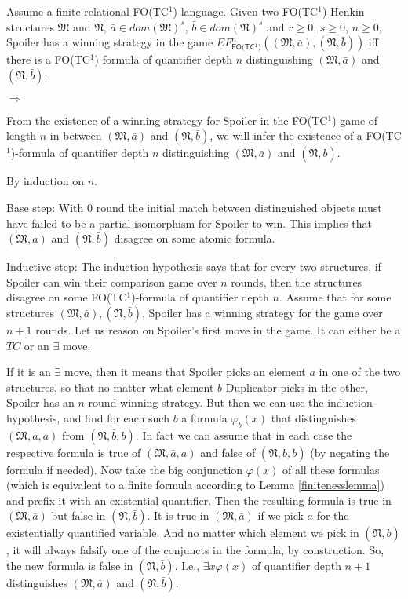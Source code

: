 \documentclass{LMCS}
\newcommand{\frM}{\mathfrak{M}}
\newcommand{\frN}{\mathfrak{N}}
\newcommand{\fotc}{\textsf{FO(TC$^1$)}\xspace}
\begin{document}
\begin{thm}[\fotc Adequacy]\label{thm:effotc}
  Assume a finite relational \fotc language. Given two \fotc-Henkin structures $\frM$ and
  $\frN$, $\bar{a} \in dom(\frM)^s$, $\bar{b} \in dom(\frN)^s$ and $r \geq 0$, $s \geq 0$, $n \geq 0$,
  Spoiler has a winning strategy in the game $EF_\fotc^n((\frM, \bar{a}), (\frN, \bar{b}))$ iff
  there is a \fotc formula of quantifier depth $n$ distinguishing $(\frM, \bar{a})$ and $(\frN, \bar{b})$.
\end{thm}

\proof\hfill

\begin{iteMize}{$\Rightarrow$}

\item From the existence of a winning strategy for
Spoiler in the \fotc-game of length $n$ in between $(\frM, \bar{a})$ and $(\frN, \bar{b})$, we will infer the
existence of a \fotc-formula of quantifier depth $n$
distinguishing $(\frM,\bar{a})$ and $(\frN,\bar{b})$.

By induction on $n$.

Base step: With $0$ round the initial match between distinguished objects must have failed to be a partial isomorphism for Spoiler to win. This
implies that $(\frM, \bar{a})$ and $(\frN, \bar{b})$ disagree on some atomic formula.

Inductive step: The induction hypothesis says that for every two
structures, if Spoiler can win their comparison game over $n$ rounds,
then the structures disagree on some \fotc-formula of quantifier depth
$n$.  Assume that for some structures $(\frM, \bar{a}), (\frN,
\bar{b})$, Spoiler has a winning strategy for the game over $n+1$
rounds. Let us reason on Spoiler's first move in the game. It can
either be a $TC$ or an $\exists$ move.

If it is an $\exists$ move, then it means that Spoiler picks an
element $a$ in one of the two structures, so that no matter what
element $b$ Duplicator picks in the other, Spoiler has an
$n$-round winning strategy. But then we can use the induction
hypothesis, and find for each such $b$ a formula $\varphi_b(x)$
that distinguishes $(\frM, \bar{a}, a)$ from $(\frN, \bar{b}, b)$.
In fact we can assume that in each case the respective formula is
true of $(\frM, \bar{a}, a)$ and false of $(\frN, \bar{b}, b)$ (by
negating the formula if needed). Now take the big conjunction
$\varphi(x)$ of all these formulas (which is equivalent to a
finite formula according to Lemma \ref{finitenesslemma}) and prefix it
with an existential quantifier. Then the resulting formula is true
in $(\frM, \bar{a})$ but false in $(\frN, \bar{b})$. It is true in
$(\frM, \bar{a})$ if we pick $a$ for the existentially quantified
variable. And no matter which element we pick in $(\frN,
\bar{b})$, it will always falsify one of the conjuncts in the
formula, by construction. So, the new formula is false in $(\frN,
\bar{b})$. I.e., $\exists x \varphi(x)$ of quantifier depth $n+1$
distinguishes $(\frM, \bar{a})$ and $(\frN, \bar{b})$.



\end{iteMize}
\end{document}
